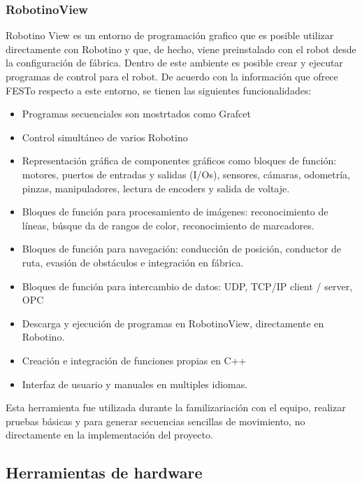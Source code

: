             \cite{ROS_concepts_MoveIt}
             
            \subsubsection{RobotinoView}
            Robotino View es un entorno de programación grafico que es posible utilizar directamente con Robotino y que, de hecho, viene preinstalado con el robot desde la configuración de fábrica. Dentro de este ambiente es posible crear y ejecutar programas de control para el robot.
            De acuerdo con la información que ofrece FESTo respecto a este entorno, se tienen las siguientes funcionalidades\cite{FESTO-RobotinoView}:
            \begin{itemize}
                \item Programas secuenciales son mostrtados como Grafcet
                \item Control simultáneo de varios Robotino
                \item Representación gráfica de componentes gráficos como bloques de función: motores, puertos de entradas y salidas (I/Os), sensores, cámaras, odometría, pinzas, manipuladores, lectura de encoders y salida de voltaje.
                \item Bloques de función para procesamiento de imágenes: reconocimiento de líneas, búsque da de rangos de color, reconocimiento de marcadores.
                \item Bloques de función para navegación: conducción de posición, conductor de ruta, evasión de obstáculos e integración en fábrica.
                \item Bloques de función para intercambio de datos: UDP, TCP/IP client / server, OPC
                \item Descarga y ejecución de programas en RobotinoView, directamente en Robotino.
                \item Creación e integración de funciones propias en C++
                \item Interfaz de usuario y manuales en multiples idiomas.
            \end{itemize}

            Esta herramienta fue utilizada durante la familizariación con el equipo, realizar pruebas básicas y para generar secuencias sencillas de movimiento, no directamente en la implementación del proyecto.
            
        \subsection{Herramientas de hardware}
